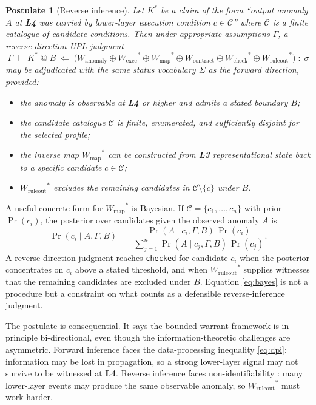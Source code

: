 \documentclass[11pt, a4paper]{article}
\theoremstyle{upldef}
\newtheorem{postulate}{Postulate}
\newcommand{\witness}[1]{\ensuremath{W_{\text{#1}}}}
\newcommand{\layer}[1]{\textbf{L#1}}
\newcommand{\statuslabel}[1]{\texttt{\small #1}}
\begin{document}
\begin{postulate}[Reverse inference]\label{post:reverse}
Let $K^*$ be a claim of the form ``output anomaly $A$ at \layer{4}
was carried by lower-layer execution condition $c \in \mathcal{C}$''
where $\mathcal{C}$ is a finite catalogue of candidate conditions.
Then under appropriate assumptions $\Gamma$, a reverse-direction UPL
judgment
\[
\Gamma \;\vdash\; K^* \;@\; B \;\Leftarrow\;
\bigl(\witness{anomaly} \oplus \witness{exec}^{*} \oplus \witness{map}^{*} \oplus \witness{contract} \oplus \witness{check}^{*} \oplus \witness{ruleout}^{*}\bigr)
\;:\; \sigma
\]
may be adjudicated with the same status vocabulary $\Sigma$ as the
forward direction, provided:
\begin{itemize}
\item the anomaly is observable at \layer{4} or higher and admits a
stated boundary $B$;
\item the candidate catalogue $\mathcal{C}$ is finite, enumerated,
and sufficiently disjoint for the selected profile;
\item the inverse map $\witness{map}^*$ can be constructed from
\layer{3} representational state back to a specific candidate
$c \in \mathcal{C}$;
\item $\witness{ruleout}^*$ excludes the remaining candidates in
$\mathcal{C} \setminus \{c\}$ under $B$.
\end{itemize}
\end{postulate}

A useful concrete form for $\witness{map}^*$ is Bayesian. If
$\mathcal{C} = \{c_1, \ldots, c_n\}$ with prior $\Pr(c_i)$, the
posterior over candidates given the observed anomaly $A$ is
\begin{equation}
\Pr(c_i \mid A, \Gamma, B)
\;=\;
\frac{\Pr(A \mid c_i, \Gamma, B) \, \Pr(c_i)}
     {\sum_{j=1}^{n} \Pr(A \mid c_j, \Gamma, B) \, \Pr(c_j)}.
\label{eq:bayes}
\end{equation}
A reverse-direction judgment reaches \statuslabel{checked} for
candidate $c_i$ when the posterior concentrates on $c_i$ above a
stated threshold, and when $\witness{ruleout}^*$ supplies witnesses
that the remaining candidates are excluded under $B$. Equation
\eqref{eq:bayes} is not a procedure but a constraint on what counts
as a defensible reverse-inference judgment.

The postulate is consequential. It says the bounded-warrant
framework is in principle bi-directional, even though the
information-theoretic challenges are asymmetric. Forward inference
faces the data-processing inequality \eqref{eq:dpi}: information may
be lost in propagation, so a strong lower-layer signal may not
survive to be witnessed at \layer{4}. Reverse inference faces
non-identifiability \citep{pearl2009}: many lower-layer events may
produce the same observable anomaly, so $\witness{ruleout}^*$ must
work harder.
\end{document}
